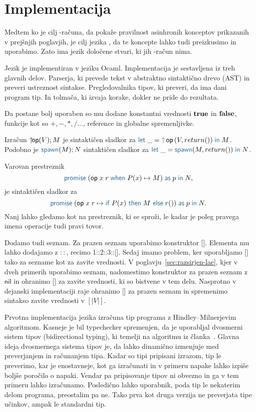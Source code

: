 \section{Implementacija}\label{sec:implementacija}

Medtem ko je cilj \lae-računa, da pokaže pravilnost asinhronih konceptov prikazanih v prejšnjih poglavjih, je cilj jezika \aeff{}, da te koncepte lahko tudi preizkusimo in uporabimo. Zato ima jezik \aeff{} določene stvari, ki jih \lae-račun nima.

Jezik \aeff{} je implementiran v jeziku Ocaml. Implementacija je sestavljena iz treh glavnih delov.
Parserja, ki prevede tekst v abstraktno sintaktično drevo (AST) in preveri ustreznost sintakse.  
Pregledovalnika tipov, ki preveri, da ima dani program tip.
In tolmača, ki izvaja korake, dokler ne pride do rezultata.


Da \aeff{} postane bolj uporaben so mu dodane konstantni vrednosti $\mathbf{true}$ in $\mathbf{false}$, funkcije kot so $+, -, *, / ...$, reference in globalne spremenljivke.

Izračun $\uparrow\hspace{-1ex}\mathsf{op} (V);M$ je sintaktičen sladkor za $\tmlet{\_}{\tmopout{op}{V}{return ()}}{M}$.
Podobno je $\tmkw{spawn}(M);N$ sintaktičen sladkor za $\tmlet{\_}{\tmspawn{M}{return ()}}{N}$. 

Varovan prestreznik $$\tmwithrecgu{op}{x}{r}{P(x)}{M}{p}{N},$$ je sintaktičen sladkor za $$\tmwithrec{op}{x}{r}{\tmif{P(x)}{M}{r()}}{p}{N}.$$
Nanj lahko gledamo kot na prestreznik, ki se sproži, le kadar je poleg pravega imena operacije tudi pravi tovor.

Dodamo tudi seznam. Za prazen seznam uporabimo konstruktor []. Elementa mu lahko dodajamo z $::$, recimo 1::2::3::[].
Sedaj imamo problem, ker uporabljamo [] tako za sezname kot za zavite vrednosti.
V poglavju~\ref{sec:razsirjen-lae}, kjer v dveh primerih uporabimo seznam, nadomestimo konstruktor za prazen seznam z $\mathsf{nil}$ in ohranimo [] za zavite vrednosti, ki so bistvene v tem delu.
Nasprotno v dejanski implementaciji \aeff{} raje ohranimo [] za prazen seznam in spremenimo sintakso zavite vrednosti v $[|V|]$. 

Prvotna implementacija jezika \aeff{} izračuna tip programa z Hindley–Milnerjevim algoritmom. 
Kasneje je bil typechecker spremenjen, da je uporabljal dvosmerni sistem tipov (bidirectional typing), ki temelji na algoritmu iz članka~\cite{bidirectional}.
Glavna ideja dvosmernega sistema tipov je, da lahko dinamično izmenjuje med preverjanjem in računanjem tipa. Kadar so tipi pripisani izrazom, tip le preverimo, kar je enostavneje, kot ga izračunati in v primeru napake lahko izpiše boljše poročilo o napaki. Vendar pa pripisovanje tipov ni obvezno in ga v tem primeru lahko izračunamo. Posledično lahko uporabnik, poda tip le nekaterim delom programa, preostalim pa ne.
Tako prva kot druga verzija ne preverjata tipe učinkov, ampak le standardni tip.

